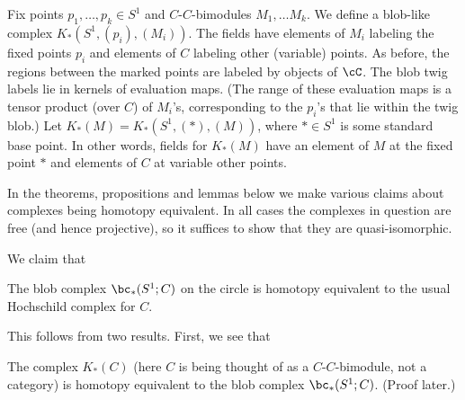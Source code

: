 Fix points $p_1, \ldots, p_k \in S^1$ and $C$-$C$-bimodules $M_1, \ldots M_k$.
We define a blob-like complex $K_*(S^1, (p_i), (M_i))$.
The fields have elements of $M_i$ labeling 
the fixed points $p_i$ and elements of $C$ labeling other (variable) points.
As before, the regions between the marked points are labeled by
objects of $\cC$.
The blob twig labels lie in kernels of evaluation maps.
(The range of these evaluation maps is a tensor product (over $C$) of $M_i$'s,
corresponding to the $p_i$'s that lie within the twig blob.)
Let $K_*(M) = K_*(S^1, (*), (M))$, where $* \in S^1$ is some standard base point.
In other words, fields for $K_*(M)$ have an element of $M$ at the fixed point $*$
and elements of $C$ at variable other points.

In the theorems, propositions and lemmas below we make various claims
about complexes being homotopy equivalent.
In all cases the complexes in question are free (and hence projective), 
so it suffices to show that they are quasi-isomorphic.

We claim that
\begin{thm} \label{hochthm}
The blob complex $\bc_*(S^1; C)$ on the circle is homotopy equivalent to the
usual Hochschild complex for $C$.
\end{thm}

This follows from two results. First, we see that
\begin{lem}
\label{lem:module-blob}%
The complex $K_*(C)$ (here $C$ is being thought of as a
$C$-$C$-bimodule, not a category) is homotopy equivalent to the blob complex
$\bc_*(S^1; C)$. (Proof later.)
\end{lem}

